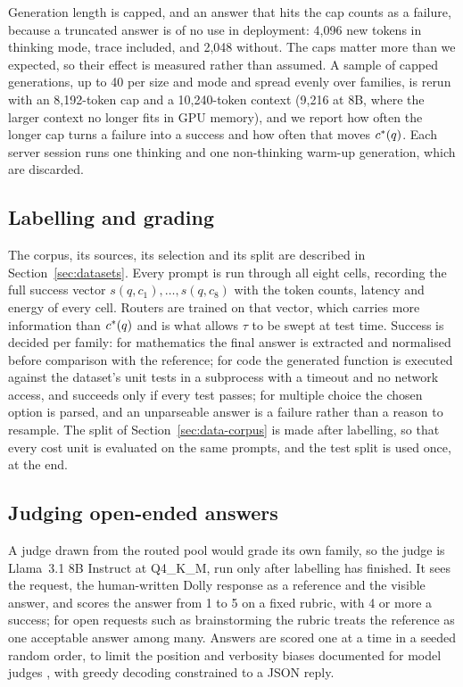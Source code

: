 Generation length is capped, and an answer that hits the cap counts as a
failure, because a truncated answer is of no use in deployment: 4{,}096 new
tokens in thinking mode, trace included, and 2{,}048 without. The caps matter
more than we expected, so their effect is measured rather than assumed. A
sample of capped generations, up to 40 per size and mode and spread evenly
over families, is rerun with an 8{,}192-token cap and a 10{,}240-token
context (9{,}216 at 8B, where the larger context no longer fits in GPU
memory), and we report how often the longer cap turns a failure into a
success and how often that moves $c^{*}(q)$. Each server session runs one
thinking and one non-thinking warm-up generation, which are discarded.

\subsection{Labelling and grading}
\label{sec:setup-labels}

The corpus, its sources, its selection and its split are described in
Section~\ref{sec:datasets}. Every prompt is run through all eight cells, recording the full success
vector $s(q, c_1), \dots, s(q, c_8)$ with the token counts, latency and
energy of every cell. Routers are trained on that vector, which carries more
information than $c^{*}(q)$ and is what allows $\tau$ to be swept at test
time. Success is decided per family: for mathematics the final answer is
extracted and normalised before comparison with the reference; for code the
generated function is executed against the dataset's unit tests in a
subprocess with a timeout and no network access, and succeeds only if every
test passes; for multiple choice the chosen option is parsed, and an
unparseable answer is a failure rather than a reason to resample. The split
of Section~\ref{sec:data-corpus} is made after labelling, so that every cost
unit is evaluated on the same prompts, and the test split is used once, at
the end.

\subsection{Judging open-ended answers}
\label{sec:setup-judge}

A judge drawn from the routed pool would grade its own family, so the judge
is Llama~3.1 8B Instruct \cite{grattafiori2024llama3} at Q4\_K\_M, run only
after labelling has finished. It sees the request, the human-written Dolly
response as a reference and the visible answer, and scores the answer from 1
to 5 on a fixed rubric, with 4 or more a success; for open requests such as
brainstorming the rubric treats the reference as one acceptable answer among
many. Answers are scored one at a time in a seeded random order, to limit the
position and verbosity biases documented for model judges
\cite{zheng2023judging}, with greedy decoding constrained to a JSON reply.

